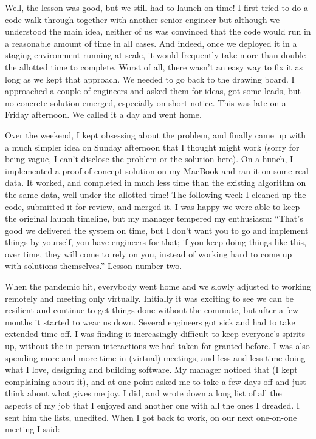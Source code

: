 \documentclass[12pt]{book}
\begin{document}
Well, the lesson was good, but we still had to launch on time! I first
tried to do a code walk-through together with another senior engineer
but although we understood the main idea, neither of us was convinced
that the code would run in a reasonable amount of time in all cases. And
indeed, once we deployed it in a staging environment running at scale,
it would frequently take more than double the allotted time to complete.
Worst of all, there wasn't an easy way to fix it as long as we kept that
approach. We needed to go back to the drawing board. I approached a
couple of engineers and asked them for ideas, got some leads, but no
concrete solution emerged, especially on short notice. This was late on
a Friday afternoon. We called it a day and went home.

Over the weekend, I kept obsessing about the problem, and finally came
up with a much simpler idea on Sunday afternoon that I thought might
work (sorry for being vague, I can't disclose the problem or the
solution here). On a hunch, I implemented a proof-of-concept solution on
my MacBook and ran it on some real data. It worked, and completed in
much less time than the existing algorithm on the same data, well under
the allotted time! The following week I cleaned up the code, submitted
it for review, and merged it. I was happy we were able to keep the
original launch timeline, but my manager tempered my enthusiasm:
``That's good we delivered the system on time, but I don't want you to
go and implement things by yourself, you have engineers for that; if you
keep doing things like this, over time, they will come to rely on you,
instead of working hard to come up with solutions themselves.'' Lesson
number two.

When the pandemic hit, everybody went home and we slowly adjusted to
working remotely and meeting only virtually. Initially it was exciting
to see we can be resilient and continue to get things done without the
commute, but after a few months it started to wear us down. Several
engineers got sick and had to take extended time off. I was finding it
increasingly difficult to keep everyone's spirits up, without the
in-person interactions we had taken for granted before. I was also
spending more and more time in (virtual) meetings, and less and less
time doing what I love, designing and building software. My manager
noticed that (I kept complaining about it), and at one point asked me to
take a few days off and just think about what gives me joy. I did, and
wrote down a long list of all the aspects of my job that I enjoyed and
another one with all the ones I dreaded. I sent him the lists, unedited.
When I got back to work, on our next one-on-one meeting I said:
\end{document}
